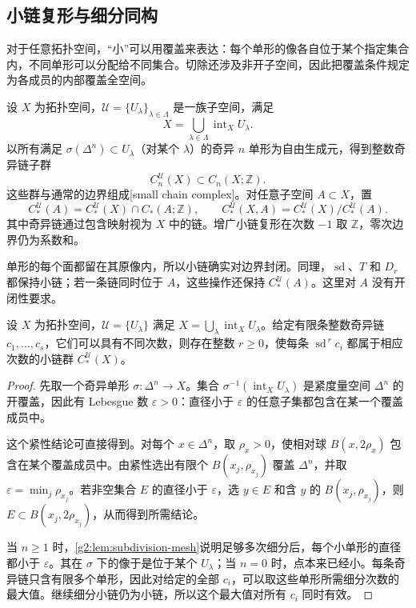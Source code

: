 \subsection{小链复形与细分同构}
\label{g2:subsec:0203:03}

对于任意拓扑空间，“小”可以用覆盖来表达：每个单形的像各自位于某个指定集合内，不同单形可以分配给不同集合。切除还涉及非开子空间，因此把覆盖条件规定为各成员的内部覆盖全空间。

\begin{definition}\label{g2:def:small-chain-complex}
	设 \(X\) 为拓扑空间，\(\mathcal U=\{U_\lambda\}_{\lambda\in\Lambda}\) 是一族子空间，满足
	\[
		X=\bigcup_{\lambda\in\Lambda}\operatorname{int}_XU_\lambda.
	\]
	以所有满足 \(\sigma(\Delta^n)\subset U_\lambda\)（对某个 \(\lambda\)）的奇异 \(n\) 单形为自由生成元，得到整数奇异链子群
	\[
		C_n^{\mathcal U}(X)\subset C_n(X;\mathbb Z).
	\]
	这些群与通常的边界组成[small chain complex]。对任意子空间 \(A\subset X\)，置
	\[
		C_*^{\mathcal U}(A)
		=C_*^{\mathcal U}(X)\cap C_*(A;\mathbb Z),\qquad
		C_*^{\mathcal U}(X,A)
		=C_*^{\mathcal U}(X)/C_*^{\mathcal U}(A).
	\]
	其中奇异链通过包含映射视为 \(X\) 中的链。增广小链复形在次数 \(-1\) 取 \(\mathbb Z\)，零次边界仍为系数和。
\end{definition}

单形的每个面都留在其原像内，所以小链确实对边界封闭。同理，\(\operatorname{sd}\)、\(T\) 和 \(D_r\) 都保持小链；若一条链同时位于 \(A\)，这些操作还保持 \(C_*^{\mathcal U}(A)\)。这里对 \(A\) 没有开闭性要求。

\begin{lemma}\label{g2:lem:finite-chain-small}
	设 \(X\) 为拓扑空间，\(\mathcal U=\{U_\lambda\}\) 满足 \(X=\bigcup_\lambda\operatorname{int}_XU_\lambda\)。给定有限条整数奇异链 \(c_1,\ldots,c_s\)，它们可以具有不同次数，则存在整数 \(r\ge0\)，使每条 \(\operatorname{sd}^{\,r}c_i\) 都属于相应次数的小链群 \(C_*^{\mathcal U}(X)\)。
\end{lemma}
\begin{proof}
	先取一个奇异单形 \(\sigma:\Delta^n\to X\)。集合 \(\sigma^{-1}(\operatorname{int}_XU_\lambda)\) 是紧度量空间 \(\Delta^n\) 的开覆盖，因此有 Lebesgue 数 \(\varepsilon>0\)：直径小于 \(\varepsilon\) 的任意子集都包含在某一个覆盖成员中。

	这个紧性结论可直接得到。对每个 \(x\in\Delta^n\)，取 \(\rho_x>0\)，使相对球 \(B(x,2\rho_x)\) 包含在某个覆盖成员中。由紧性选出有限个 \(B(x_j,\rho_{x_j})\) 覆盖 \(\Delta^n\)，并取 \(\varepsilon=\min_j\rho_{x_j}\)。若非空集合 \(E\) 的直径小于 \(\varepsilon\)，选 \(y\in E\) 和含 \(y\) 的 \(B(x_j,\rho_{x_j})\)，则 \(E\subset B(x_j,2\rho_{x_j})\)，从而得到所需结论。

	当 \(n\ge1\) 时，\cref{g2:lem:subdivision-mesh}说明足够多次细分后，每个小单形的直径都小于 \(\varepsilon\)。其在 \(\sigma\) 下的像于是位于某个 \(U_\lambda\)；当 \(n=0\) 时，点本来已经小。每条奇异链只含有限多个单形，因此对给定的全部 \(c_i\)，可以取这些单形所需细分次数的最大值。继续细分小链仍为小链，所以这个最大值对所有 \(c_i\) 同时有效。
\end{proof}

